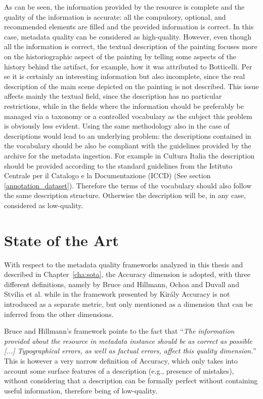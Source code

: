 \documentclass[epsfig,a4paper,12pt,titlepage]{book}
\begin{document}
As can be seen, the information provided by the resource is complete and the quality of the information is accurate: all the compulsory, optional, and recommended elements are filled and the provided information is correct. In this case, metadata quality can be considered as high-quality. However, even though all the information is correct, the textual description of the painting focuses more on the historiographic aspect of the painting by telling some aspects of the history behind the artifact, for example, how it was attributed to Botticelli. Per se it is certainly an interesting information but also incomplete, since the real description of the main scene depicted on the painting is not described.
This issue affects mainly the textual field, since the description has no particular restrictions, while in the fields where the information should be preferably be managed via a taxonomy or a controlled vocabulary as the subject this problem is obviously less evident. 
Using the same methodology also in the case of descriptions would lead to an underlying problem: the descriptions contained in the vocabulary should be also be compliant with the guidelines provided by the archive for the metadata ingestion. For example in Cultura Italia the description should be provided according to the standard guidelines from the Istituto Centrale per il Catalogo e la Documentazione (ICCD) (See section \ref{annotation_dataset}). Therefore the terms of the vocabulary should also follow the same description structure. Otherwise the description will be, in any case, considered as low-quality.

\section{State of the Art}
\label{sec:accustate}
With respect to the metadata quality frameworks analyzed in this thesis and described in Chapter~\ref{cha:sota}, the Accuracy dimension is adopted, with three different definitions, namely by Bruce and Hillmann, Ochoa and Duvall and Stvilia et al. while in the framework presented by Kir{\'a}ly Accuracy is not introduced as a separate metric, but only mentioned as a dimension that can be inferred from the other dimensions.

Bruce and Hillmann's framework points to the fact that ``\textit{The information provided about the resource in metadata instance should be as correct as possible [...] Typographical errors, as well as factual errors, affect this quality dimension.}'' This is however a very narrow definition of Accuracy, which only takes into account some surface features of a description (e.g., presence of mistakes), without considering that a description can be formally perfect without containing useful information, therefore being of low-quality.
 
\end{document}
